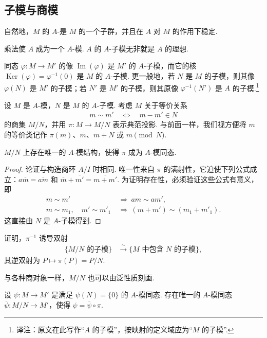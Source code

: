 \subsection{子模与商模}\label{sec:galois-1-3-3}
自然地，$M$ 的 $A$-是 $M$ 的一个子群，并且在 $A$ 对 $M$ 的作用下稳定.
\begin{remark*}
乘法使 $A$ 成为一个 $A$-模. $A$ 的 $A$-子模无非就是 $A$ 的理想.
\end{remark*}
\begin{example*}
同态 $\varphi\colon M\longrightarrow M'$ 的像 $\operatorname{Im}(\varphi)$ 是 $M'$ 的 $A$-子模，而它的核 $\operatorname{Ker}(\varphi)=\varphi^{-1}(0)$ 是 $M$ 的 $A$-子模. 更一般地，若 $N$ 是 $M$ 的子模，则其像 $\varphi(N)$ 是 $M'$ 的子模；若 $N'$ 是 $M'$ 的子模，则其原像 $\varphi^{-1}(N')$ 是 $A$ 的子模.\footnote{译注：原文在此写作``$A$ 的子模''，按映射的定义域应为``$M$ 的子模''.}
\end{example*}
设 $M$ 是 $A$-模，$N$ 是 $M$ 的 $A$-子模. 考虑 $M$ 关于等价关系
\begin{align*}
 m\sim m'\quad\Longleftrightarrow\quad m-m'\in N
\end{align*}
的商集 $M/N$，并用 $\pi\colon M\longrightarrow M/N$ 表示典范投影. 与前面一样，我们视方便将 $m$ 的等价类记作 $\pi(m)$、$\overline m$、$m+N$ 或 $m\pmod N$.
\begin{proposition*}
$M/N$ 上存在唯一的 $A$-模结构，使得 $\pi$ 成为 $A$-模同态.
\end{proposition*}
\begin{proof}
论证与构造商环 $A/I$ 时相同. 唯一性来自 $\pi$ 的满射性，它迫使下列公式成立：$a\overline m=\overline{am}$ 和 $\overline m+\overline{m'}=\overline{m+m'}$. 为证明存在性，必须验证这些公式有意义，即
\begin{align*}
 m\sim m'&\ \Longrightarrow\ am\sim am',\\
 m\sim m_1,\quad m'\sim m'_1&\ \Longrightarrow\ (m+m')\sim(m_1+m'_1).
\end{align*}
这直接由 $N$ 是 $A$-子模得到.
\end{proof}
\begin{exercise*}
证明，$\pi^{-1}$ 诱导双射
\begin{align*}
 \{M/N\text{ 的子模}\}&\xrightarrow{\sim}\{M\text{ 中包含 }N\text{ 的子模}\},
\end{align*}
其逆双射为 $P\longmapsto\pi(P)=P/N$.
\end{exercise*}
与各种商对象一样，$M/N$ 也可以由泛性质刻画.
\begin{proposition*}
设 $\psi\colon M\longrightarrow M'$ 是满足 $\psi(N)=\{0\}$ 的 $A$-模同态. 存在唯一的 $A$-模同态 $\overline\psi\colon M/N\longrightarrow M'$，使得 $\psi=\overline\psi\circ\pi$.
\end{proposition*}
